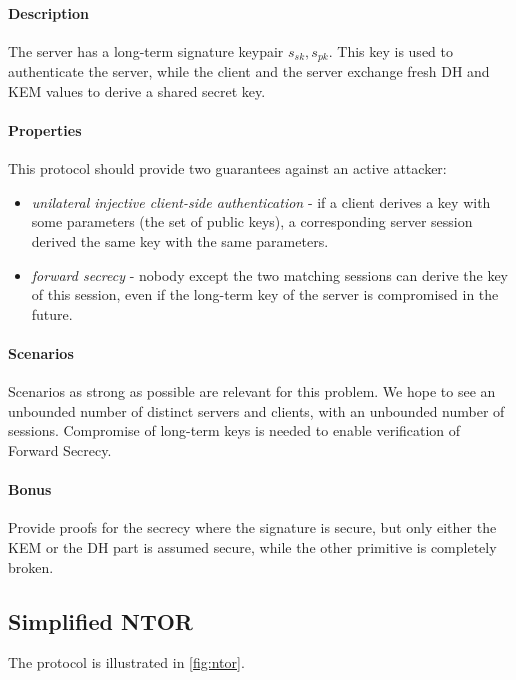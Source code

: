 \documentclass[11pt]{article}
\newcommand{\sfsk}{\mathit{sk}}
\newcommand{\sfpk}{\mathit{pk}}
\begin{document}
 \paragraph{Description} The server has a long-term signature keypair $s_\sfsk,s_\sfpk$. 
This key is used to authenticate the server, while the client and the server exchange fresh DH and KEM values to derive a shared secret key.

\paragraph{Properties} This protocol should provide two guarantees against an active attacker:
\begin{itemize}
\item \emph{unilateral injective client-side authentication} - if a client derives a key with some parameters (the set of public keys), a corresponding server session derived the same key with the same parameters.
\item \emph{forward secrecy} - nobody except the two matching sessions can derive the key of this session, even if the long-term key of the server is compromised in the future.
\end{itemize}

\paragraph{Scenarios} Scenarios as strong as possible are relevant for this problem. We hope to see an unbounded number of distinct servers and clients, with an unbounded number of sessions. Compromise of long-term keys is needed to enable verification of Forward Secrecy.  

\paragraph{Bonus} Provide proofs for the secrecy where the signature is secure, but only either the KEM or the DH part is assumed secure, while the other primitive is completely broken.

\subsection{Simplified NTOR}\label{prob:ntor}

The protocol is illustrated in \cref{fig:ntor}.
\end{document}

